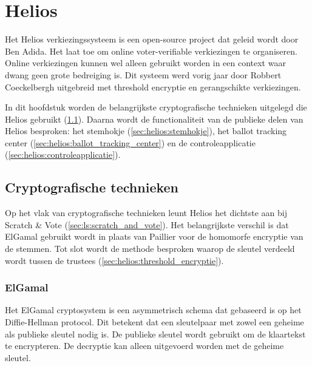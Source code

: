 % 
%


\chapter{Helios}
\label{chap:helios}

Het Helios verkiezingssysteem is een open-source project dat geleid wordt door Ben Adida.\cite{adida_helios} Het laat toe om online voter-verifiable verkiezingen te organiseren. Online verkiezingen kunnen wel alleen gebruikt worden in een context waar dwang geen grote bedreiging is. Dit systeem werd vorig jaar door Robbert Coeckelbergh uitgebreid met threshold encryptie en gerangschikte verkiezingen.\cite{coeckelbergh_toepassing_en_uitbreiding_van_het_helios_online_verkiezingssysteem} 

\npar In dit hoofdstuk worden de belangrijkste cryptografische technieken uitgelegd die Helios gebruikt (\ref{sec:helios:cryptografische_technieken}). Daarna wordt de functionaliteit van de publieke delen van Helios besproken: het stemhokje (\ref{sec:helios:stemhokje}), het ballot tracking center (\ref{sec:helios:ballot_tracking_center}) en de controleapplicatie (\ref{sec:helios:controleapplicatie}).

\section{Cryptografische technieken}
\label{sec:helios:cryptografische_technieken}

Op het vlak van cryptografische technieken leunt Helios het dichtste aan bij Scratch \& Vote (\ref{sec:ls:scratch_and_vote}). Het belangrijkste verschil is dat ElGamal gebruikt wordt in plaats van Paillier voor de homomorfe encryptie van de stemmen. Tot slot wordt de methode besproken waarop de sleutel verdeeld wordt tussen de trustees (\ref{sec:helios:threshold_encryptie}).

\subsection{ElGamal~\cite{elgamal_elgamal}}
\label{sec:helios:elgamal}

Het ElGamal cryptosystem is een asymmetrisch schema dat gebaseerd is op het Diffie-Hellman protocol. Dit betekent dat een sleutelpaar met zowel een geheime als publieke sleutel nodig is. De publieke sleutel wordt gebruikt om de klaartekst te encrypteren. De decryptie kan alleen uitgevoerd worden met de geheime sleutel.

